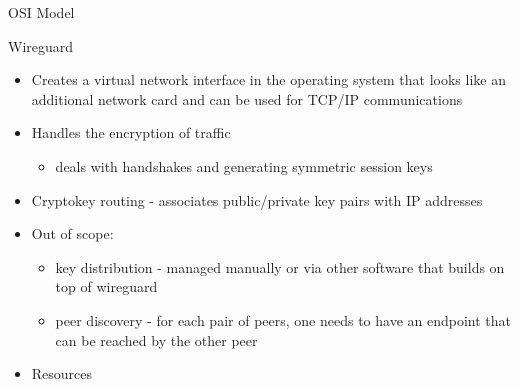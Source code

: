 \begin{frame}[fragile]{OSI Model}
\begin{block}{Wireguard}
\newpage

\begin{Shaded}
\begin{Highlighting}[]
\KeywordTok{[Interface]}
\OtherTok{=}
\OtherTok{=}\StringTok{ }
\OtherTok{=}

\KeywordTok{[Peer]}
\OtherTok{=}
\OtherTok{=}
\OtherTok{=}
\OtherTok{=}\StringTok{ }
\end{Highlighting}
\end{Shaded}

\begin{itemize}
\tightlist
\item
  Creates a virtual network interface in the operating system that looks
  like an additional network card and can be used for TCP/IP
  communications
\item
  Handles the encryption of traffic

  \begin{itemize}
  \tightlist
  \item
    deals with handshakes and generating symmetric session keys
  \end{itemize}
\item
  Cryptokey routing - associates public/private key pairs with IP
  addresses
\item
  Out of scope:

  \begin{itemize}
  \tightlist
  \item
    key distribution - managed manually or via other software that
    builds on top of wireguard
  \item
    peer discovery - for each pair of peers, one needs to have an
    endpoint that can be reached by the other peer
  \end{itemize}
\item
  Resources


\end{itemize}
\end{block}
\end{frame}

